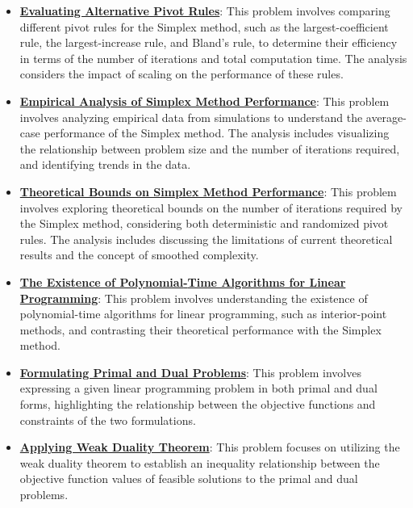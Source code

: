 \documentclass{article}%
\begin{document}
\begin{itemize}[leftmargin=*]
\item \href{https://www.math.purdue.edu/~yipn/421/2024-09-05-SimplexEfficiency.pdf#page=6}{\textbf{Evaluating Alternative Pivot Rules}}: This problem involves comparing different pivot rules for the Simplex method, such as the largest-coefficient rule, the largest-increase rule, and Bland's rule, to determine their efficiency in terms of the number of iterations and total computation time. The analysis considers the impact of scaling on the performance of these rules.%
\item \href{https://www.math.purdue.edu/~yipn/421/2024-09-05-SimplexEfficiency.pdf#page=9}{\textbf{Empirical Analysis of Simplex Method Performance}}: This problem involves analyzing empirical data from simulations to understand the average-case performance of the Simplex method. The analysis includes visualizing the relationship between problem size and the number of iterations required, and identifying trends in the data.%
\item \href{https://www.math.purdue.edu/~yipn/421/2024-09-05-SimplexEfficiency.pdf#page=10}{\textbf{Theoretical Bounds on Simplex Method Performance}}: This problem involves exploring theoretical bounds on the number of iterations required by the Simplex method, considering both deterministic and randomized pivot rules. The analysis includes discussing the limitations of current theoretical results and the concept of smoothed complexity.%
\item \href{https://www.math.purdue.edu/~yipn/421/2024-09-05-SimplexEfficiency.pdf#page=12}{\textbf{The Existence of Polynomial{-}Time Algorithms for Linear Programming}}: This problem involves understanding the existence of polynomial-time algorithms for linear programming, such as interior-point methods, and contrasting their theoretical performance with the Simplex method.%
\item \href{https://www.math.purdue.edu/~yipn/421/2024-09-12-Duality.pdf#page=1}{\textbf{Formulating Primal and Dual Problems}}: This problem involves expressing a given linear programming problem in both primal and dual forms, highlighting the relationship between the objective functions and constraints of the two formulations.%
\item \href{https://www.math.purdue.edu/~yipn/421/2024-09-12-Duality.pdf#page=2}{\textbf{Applying Weak Duality Theorem}}: This problem focuses on utilizing the weak duality theorem to establish an inequality relationship between the objective function values of feasible solutions to the primal and dual problems.%

\end{itemize}
\end{document}
